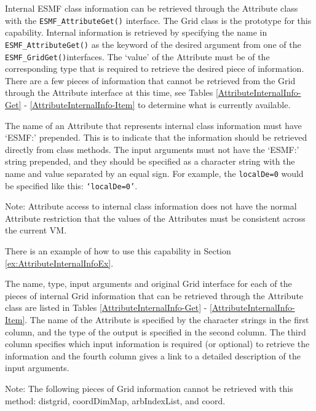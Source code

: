 
\label{sec:InternalInfo}

Internal ESMF class information can be retrieved through the Attribute 
class with the {\tt ESMF\_AttributeGet()} interface.  The Grid class is
the prototype for this capability.  Internal information is retrieved by 
specifying the name in {\tt ESMF\_AttributeGet()} as the keyword of the 
desired argument from one of the {\tt ESMF\_GridGet()}interfaces.  
The `value' of the Attribute must be of the corresponding type
that is required to retrieve the desired piece of information.  There are 
a few pieces of information that cannot be retrieved from the Grid
through the Attribute interface at this time, see Tables 
\ref{AttributeInternalInfo-Get} - \ref{AttributeInternalInfo-Item} to
determine what is currently available.

The name of an Attribute that represents internal class information must have 
`ESMF:' prepended.  This is to indicate that the information should be retrieved
directly from class methods.  The input arguments must not have the `ESMF:'
string prepended, and they should be specified as a character string with the name
and value separated by an equal sign.  For example, the {\tt localDe=0} would be 
specified like this: {\tt `localDe=0'}.

Note: Attribute access to internal class information does not
have the normal Attribute restriction that the values of the Attributes must be
consistent across the current VM.

There is an example of how to use this capability in Section 
\ref{ex:AttributeInternalInfoEx}.

The name, type, input arguments and original Grid interface for each of the 
pieces of internal Grid information that can be retrieved through the Attribute 
class are listed in Tables \ref{AttributeInternalInfo-Get} - 
\ref{AttributeInternalInfo-Item}.  
The name of the Attribute is specified by the character strings in the first 
column, and the type of the output is specified in the second column.
The third column specifies which input information is required (or optional) 
to retrieve the information and the fourth column gives a link to a detailed
description of the input arguments.

Note: The following pieces of Grid information cannot be retrieved with this 
method: distgrid, coordDimMap, arbIndexList, and coord.

